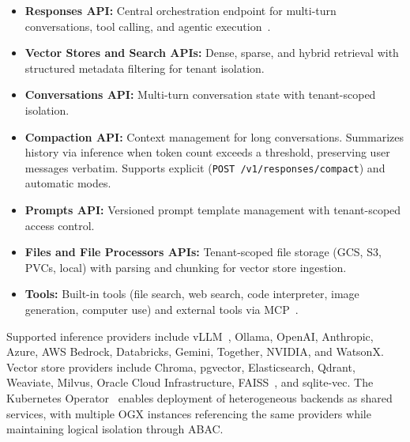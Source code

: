 \documentclass[sigconf]{acmart}
\begin{document}
\begin{itemize}[nosep]
  \item \textbf{Responses API:} Central orchestration endpoint for multi-turn conversations, tool calling, and agentic execution~\cite{openaiResponsesAPI}.
  \item \textbf{Vector Stores and Search APIs:} Dense, sparse, and hybrid retrieval with structured metadata filtering for tenant isolation.
  \item \textbf{Conversations API:} Multi-turn conversation state with tenant-scoped isolation.
  \item \textbf{Compaction API:} Context management for long conversations. Summarizes history via inference when token count exceeds a threshold, preserving user messages verbatim. Supports explicit (\texttt{POST /v1/responses/compact}) and automatic modes.
  \item \textbf{Prompts API:} Versioned prompt template management with tenant-scoped access control.
  \item \textbf{Files and File Processors APIs:} Tenant-scoped file storage (GCS, S3, PVCs, local) with parsing and chunking for vector store ingestion.
  \item \textbf{Tools:} Built-in tools (file search, web search, code interpreter, image generation, computer use) and external tools via MCP~\cite{mcp}.
\end{itemize}

\noindent Supported inference providers include vLLM~\cite{kwon2023vllm}, Ollama, OpenAI, Anthropic, Azure, AWS Bedrock, Databricks, Gemini, Together, NVIDIA, and WatsonX. Vector store providers include Chroma, pgvector, Elasticsearch, Qdrant, Weaviate, Milvus, Oracle Cloud Infrastructure, FAISS~\cite{johnson2017faiss}, and sqlite-vec. The Kubernetes Operator~\cite{ogxk8soperator} enables deployment of heterogeneous backends as shared services, with multiple OGX instances referencing the same providers while maintaining logical isolation through ABAC.
\end{document}
